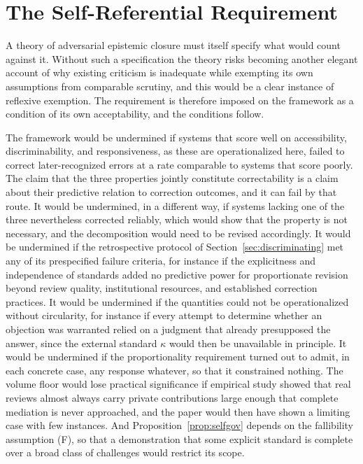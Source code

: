 \documentclass[11pt]{article}
\theoremstyle{remark}
\begin{document}
\section{The Self-Referential Requirement}
\label{sec:selfapp}

A theory of adversarial epistemic closure must itself specify what would count against it. Without such a specification the theory risks becoming another elegant account of why existing criticism is inadequate while exempting its own assumptions from comparable scrutiny, and this would be a clear instance of reflexive exemption. The requirement is therefore imposed on the framework as a condition of its own acceptability, and the conditions follow.

The framework would be undermined if systems that score well on accessibility, discriminability, and responsiveness, as these are operationalized here, failed to correct later-recognized errors at a rate comparable to systems that score poorly. The claim that the three properties jointly constitute correctability is a claim about their predictive relation to correction outcomes, and it can fail by that route. It would be undermined, in a different way, if systems lacking one of the three nevertheless corrected reliably, which would show that the property is not necessary, and the decomposition would need to be revised accordingly. It would be undermined if the retrospective protocol of Section~\ref{sec:discriminating} met any of its prespecified failure criteria, for instance if the explicitness and independence of standards added no predictive power for proportionate revision beyond review quality, institutional resources, and established correction practices. It would be undermined if the quantities could not be operationalized without circularity, for instance if every attempt to determine whether an objection was warranted relied on a judgment that already presupposed the answer, since the external standard $\kappa$ would then be unavailable in principle. It would be undermined if the proportionality requirement turned out to admit, in each concrete case, any response whatever, so that it constrained nothing. The volume floor would lose practical significance if empirical study showed that real reviews almost always carry private contributions large enough that complete mediation is never approached, and the paper would then have shown a limiting case with few instances. And Proposition~\ref{prop:selfgov} depends on the fallibility assumption (F), so that a demonstration that some explicit standard is complete over a broad class of challenges would restrict its scope.
\end{document}
